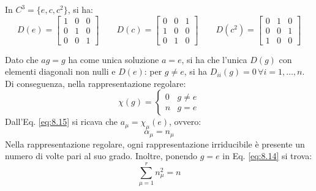 \begin{example}
	In $ C^3 = \{e,c,c^2\} $, si ha:
	\begin{equation*}
		D(e) =
		\begin{bmatrix}
			1 & 0 & 0 \\
			0 & 1 & 0 \\
			0 & 0 & 1
		\end{bmatrix}
		\qquad
		D(c) =
		\begin{bmatrix}
			0 & 0 & 1 \\
			1 & 0 & 0 \\
			0 & 1 & 0
		\end{bmatrix}
		\qquad
		D(c^2) =
		\begin{bmatrix}
			0 & 1 & 0 \\
			0 & 0 & 1 \\
			1 & 0 & 0
		\end{bmatrix}
	\end{equation*}
\end{example}

Dato che $ ag = g $ ha come unica soluzione $ a = e $, si ha che l'unica $ D(g) $ con elementi diagonali non nulli e $ D(e) $: per $ g \neq e $, si ha $ D_{ii}(g) = 0 \,\forall i = 1, \dots, n $. Di conseguenza, nella rappresentazione regolare:
\begin{equation}
	\chi(g) =
	\begin{cases}
		0 & g \neq e \\
		n & g = e
	\end{cases}
	\label{eq:8.17}
\end{equation}
Dall'Eq. \ref{eq:8.15} si ricava che $ a_{\mu} = \chi_{\mu}(e) $, ovvero:
\begin{equation}
	\alpha_{\mu} = n_{\mu}
	\label{eq:8.18}
\end{equation}
Nella rappresentazione regolare, ogni rappresentazione irriducibile è presente un numero di volte pari al suo grado. Inoltre, ponendo $ g = e $ in Eq. \ref{eq:8.14} si trova:
\begin{equation}
	\sum_{\mu = 1}^{r} n_{\mu}^2 = n
	\label{eq:8.19}
\end{equation}










